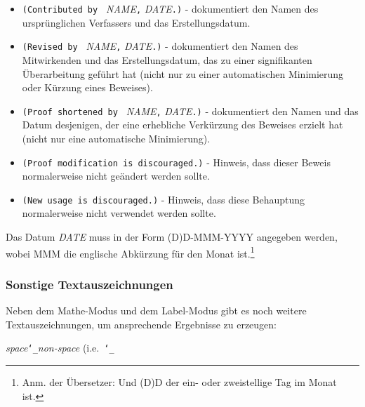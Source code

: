 \begin{itemize}
 \item[] \texttt{(Contributed by }
   \textit{NAME}\texttt{,} \textit{DATE}\texttt{.)} -
   dokumentiert den Namen des ursprünglichen Verfassers und das Erstellungsdatum.
 \item[] \texttt{(Revised by }
   \textit{NAME}\texttt{,} \textit{DATE}\texttt{.)} -
   dokumentiert den Namen des Mitwirkenden und das Erstellungsdatum, das zu einer signifikanten Überarbeitung geführt hat (nicht nur zu einer automatischen Minimierung oder Kürzung eines Beweises).
 \item[] \texttt{(Proof shortened by }
   \textit{NAME}\texttt{,} \textit{DATE}\texttt{.)} -
   dokumentiert den Namen und das Datum desjenigen, der eine erhebliche Verkürzung des Beweises erzielt hat (nicht nur eine automatische Minimierung).
 \item[] \texttt{(Proof modification is discouraged.)} -
   Hinweis, dass dieser Beweis normalerweise nicht geändert werden sollte.
 \item[] \texttt{(New usage is discouraged.)} -
   Hinweis, dass diese Behauptung normalerweise nicht verwendet werden sollte.
\end{itemize}

Das Datum \textit{DATE} muss in der Form (D)D-MMM-YYYY angegeben werden, wobei MMM die englische Abkürzung für den Monat ist.\footnote{Anm. der Übersetzer: Und (D)D der ein- oder zweistellige Tag im Monat ist.}

\subsubsection{Sonstige Textauszeichnungen}\label{othermarkup}

Neben dem Mathe-Modus und dem Label-Modus gibt es noch weitere Textauszeichnungen, um ansprechende Ergebnisse zu erzeugen:


 {\em space}\texttt{\char`\_}{\em non-space} (i.e.\ \texttt{\char`\_}

